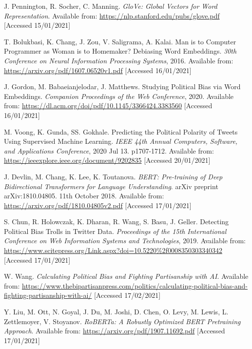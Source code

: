 \begin{thebibliography}{9}
J. Pennington, R. Socher, C. Manning. \textit{GloVe: Global Vectors for Word Representation}. Available from: \url{https://nlp.stanford.edu/pubs/glove.pdf} [Accessed 15/01/2021]

T. Bolukbasi, K. Chang, J. Zou, V. Saligrama, A. Kalai. Man is to Computer Programmer as Woman is to
Homemaker? Debiasing Word Embeddings. \textit{30th Conference on Neural Information Processing Systems}, 2016. Available from: \url{https://arxiv.org/pdf/1607.06520v1.pdf} [Accessed 16/01/2021]

J. Gordon, M. Babaeianjelodar, J. Matthews. Studying Political Bias via Word Embeddings. \textit{Companion Proceedings of the Web Conference}, 2020. Available from: \url{https://dl.acm.org/doi/pdf/10.1145/3366424.3383560} [Accessed 16/01/2021]

M. Voong, K. Gunda, SS. Gokhale. Predicting the Political Polarity of Tweets Using Supervised Machine Learning. \textit{IEEE 44th Annual Computers, Software, and Applications Conference}, 2020 Jul 13. p1707-1712. Available from: \url{https://ieeexplore.ieee.org/document/9202835} [Accessed 20/01/2021]

J. Devlin, M. Chang, K. Lee, K. Toutanova. \textit{BERT: Pre-training of Deep Bidirectional Transformers for Language Understanding}. arXiv preprint arXiv:1810.04805. 11th October 2018. Available from: \url{https://arxiv.org/pdf/1810.04805v2.pdf} [Accessed 17/01/2021]

S. Chun, R. Holowczak, K. Dharan, R. Wang, S. Basu, J. Geller. Detecting Political Bias Trolls in Twitter Data. \textit{Proceedings of the 15th International Conference on Web Information Systems and Technologies}, 2019. Available from: \url{https://www.scitepress.org/Link.aspx?doi=10.5220\%2f0008350303340342} [Accessed 17/01/2021]

W. Wang. \textit{Calculating Political Bias and Fighting Partisanship with AI}. Available from: \url{https://www.thebipartisanpress.com/politics/calculating-political-bias-and-fighting-partisanship-with-ai/} [Accessed 17/02/2021]

Y. Liu, M. Ott, N. Goyal, J. Du, M. Joshi, D. Chen, O. Levy, M. Lewis, L. Zettlemoyer, V. Stoyanov. \textit{RoBERTa: A Robustly Optimized BERT Pretraining Approach}. Available from: \url{https://arxiv.org/pdf/1907.11692.pdf} [Accessed 17/01/2021]


\end{thebibliography}

